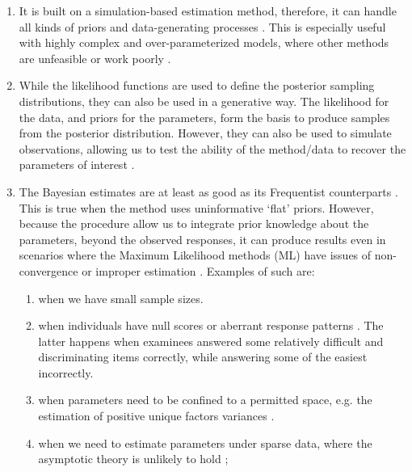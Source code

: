 \begin{enumerate}	
	\item It is built on a simulation-based estimation method, therefore, it can handle all kinds of priors and data-generating processes \cite{Fox_2010}. This is especially useful with highly complex and over-parameterized models, where other methods are unfeasible or work poorly \cite{Baker_1998, Kim_1999}. 
	
	\item While the likelihood functions are used to define the posterior sampling distributions, they can also be used in a generative way. The likelihood for the data, and priors for the parameters, form the basis to produce samples from the posterior distribution. However, they can also be used to simulate observations, allowing us to test the ability of the method/data to recover the parameters of interest \cite{McElreath_2020}.
	
	\item The Bayesian estimates are at least as good as its Frequentist counterparts \cite{Baker_1998, Wollack_2002, Hsieh_2010}. This is true when the method uses uninformative `flat' priors. However, because the procedure allow us to integrate prior knowledge about the parameters, beyond the observed responses, it can produce results even in scenarios where the Maximum Likelihood methods (ML) have issues of non-convergence or improper estimation \cite{Skrondal_et_al_2004a, Fox_2010, McElreath_2020}. Examples of such are: 
	
	\begin{enumerate}
		\item when we have small sample sizes.
		
		\item when individuals have null scores or aberrant response patterns \cite{Hambleton_et_al_1991a, Azevedo_2003}. The latter happens when examinees answered some relatively difficult and discriminating items correctly, while answering some of the easiest incorrectly.
		
		\item when parameters need to be confined to a permitted space, e.g. the estimation of positive unique factors variances \cite{Martin_et_al_1975}.
		
		\item when we need to estimate parameters under sparse data, where the asymptotic theory is unlikely to hold \cite{Fox_2010};
		
	\end{enumerate}
	
\end{enumerate}

